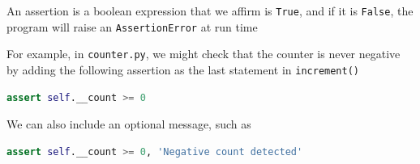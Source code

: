 \documentclass[8pt,a4paper,compress]{beamer}
\begin{document}
\begin{frame}[fragile]
\pause

An assertion is a boolean expression that we affirm is \lstinline{True}, and if it is \lstinline{False}, the program will raise an \lstinline{AssertionError} at run time

\pause
\bigskip

For example, in \lstinline{counter.py}, we might check that the counter is never negative by adding the following assertion as the last statement in \lstinline{increment()}
\begin{lstlisting}[language=Python]
assert self.__count >= 0
\end{lstlisting} 

\pause
\bigskip

We can also include an optional message, such as
\begin{lstlisting}[language=Python]
assert self.__count >= 0, 'Negative count detected'
\end{lstlisting} 
\end{frame}
\end{document}
